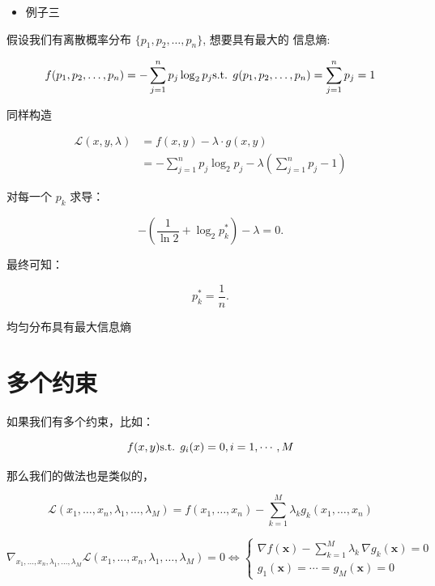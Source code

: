 \documentclass[
]{book}
\providecommand{\tightlist}{%
  \setlength{\itemsep}{0pt}\setlength{\parskip}{0pt}}
\begin{document}
\begin{itemize}
\tightlist
\item
  例子三
\end{itemize}

假设我们有离散概率分布 \(\{p_{1},p_{2},\ldots ,p_{n}\}\), 想要具有最大的 信息熵:

\[
f(p_{1},p_{2},\ldots ,p_{n})=-\sum _{j=1}^{n}p_{j}\log _{2}p_{j} \\
\text{s.t. } g(p_{1},p_{2},\ldots ,p_{n})=\sum _{j=1}^{n}p_{j}=1
\]

同样构造

\[{\displaystyle {\begin{aligned}{\mathcal {L}}(x,y,\lambda )&=f(x,y) - \lambda \cdot g(x,y)\\[4pt]&= -\sum _{j=1}^{n}p_{j}\log _{2}p_{j} - \lambda (\sum _{j=1}^{n}p_{j} - 1)\end{aligned}}}\]

对每一个 \(p_k\) 求导：

\[
-\left({\frac {1}{\ln 2}}+\log _{2}p_{k}^{*}\right) - \lambda =0.
\]

最终可知：

\[
p_{k}^{*}={\frac {1}{n}}.
\]

均匀分布具有最大信息熵

\hypertarget{ux591aux4e2aux7ea6ux675f}{%
\section{多个约束}\label{ux591aux4e2aux7ea6ux675f}}

如果我们有多个约束，比如：

\[
f(x,y) \\
\text{s.t. } g_i(x) = 0, i = 1, \cdots , M
\]

那么我们的做法也是类似的，

\[
{\displaystyle {\mathcal {L}}\left(x_{1},\ldots ,x_{n},\lambda _{1},\ldots ,\lambda _{M}\right)=f\left(x_{1},\ldots ,x_{n}\right)-\sum \limits _{k=1}^{M}{\lambda _{k}g_{k}\left(x_{1},\ldots ,x_{n}\right)}} 
\]

\[
{\displaystyle \nabla _{x_{1},\ldots ,x_{n},\lambda _{1},\ldots ,\lambda _{M}}{\mathcal {L}}(x_{1},\ldots ,x_{n},\lambda _{1},\ldots ,\lambda _{M})=0\iff {\begin{cases}\nabla f(\mathbf {x} )-\sum _{k=1}^{M}{\lambda _{k}\,\nabla g_{k}(\mathbf {x} )}=0\\g_{1}(\mathbf {x} )=\cdots =g_{M}(\mathbf {x} )=0\end{cases}}}
\]
\end{document}
